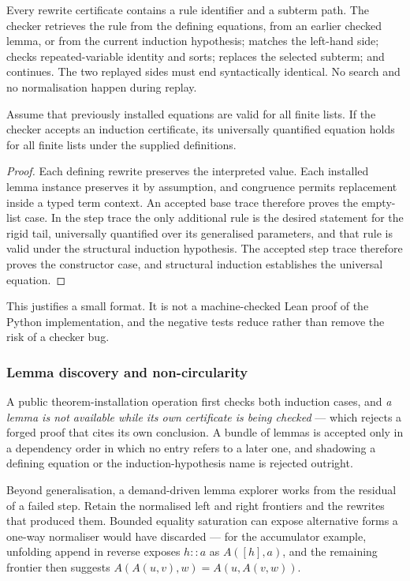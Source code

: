 Every rewrite certificate contains a rule identifier and a subterm path. The
checker retrieves the rule from the defining equations, from an earlier checked
lemma, or from the current induction hypothesis; matches the left-hand side;
checks repeated-variable identity and sorts; replaces the selected subterm; and
continues. The two replayed sides must end syntactically identical. No search
and no normalisation happen during replay.

\begin{proposition}
Assume that previously installed equations are valid for all finite lists. If
the checker accepts an induction certificate, its universally quantified
equation holds for all finite lists under the supplied definitions.
\end{proposition}
\begin{proof}
Each defining rewrite preserves the interpreted value. Each installed lemma
instance preserves it by assumption, and congruence permits replacement inside
a typed term context. An accepted base trace therefore proves the empty-list
case. In the step trace the only additional rule is the desired statement for
the rigid tail, universally quantified over its generalised parameters, and that
rule is valid under the structural induction hypothesis. The accepted step trace
therefore proves the constructor case, and structural induction establishes the
universal equation.
\end{proof}

This justifies a small format. It is not a machine-checked Lean proof of the
Python implementation, and the negative tests reduce rather than remove the risk
of a checker bug.

\subsubsection*{Lemma discovery and non-circularity}

A public theorem-installation operation first checks both induction cases, and
\emph{a lemma is not available while its own certificate is being checked} ---
which rejects a forged proof that cites its own conclusion. A bundle of lemmas
is accepted only in a dependency order in which no entry refers to a later one,
and shadowing a defining equation or the induction-hypothesis name is rejected
outright.

Beyond generalisation, a demand-driven lemma explorer works from the residual
of a failed step. Retain the normalised left and right frontiers and the
rewrites that produced them. Bounded equality saturation can expose alternative
forms a one-way normaliser would have discarded --- for the accumulator example,
unfolding append in reverse exposes $h::a$ as $A([h],a)$, and the remaining
frontier then suggests $A(A(u,v),w)=A(u,A(v,w))$.

